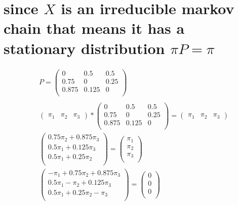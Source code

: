 \documentclass[11px]{article}
\begin{document}
\section*{since $X$ is an irreducible markov chain that means it has a stationary distribution $\pi P = \pi$}

\begin{equation}
\begin{split}
& P = \begin{pmatrix}
0 & 0.5 & 0.5 \\
0.75 & 0 & 0.25 \\
0.875 & 0.125 & 0 \\
\end{pmatrix} 
\\
\\
& \begin{pmatrix}
\pi_1 & \pi_2 & \pi_3
\end{pmatrix}
*
\begin{pmatrix}
0 & 0.5 & 0.5 \\
0.75 & 0 & 0.25 \\
0.875 & 0.125 & 0 \\
\end{pmatrix}
= \begin{pmatrix}
\pi_1 & \pi_2 & \pi_3
\end{pmatrix} \\
& \begin{pmatrix}
0.75 \pi_2 + 0.875 \pi_3 \\
0.5 \pi_1 + 0.125 \pi_3 \\
0.5 \pi_1 + 0.25 \pi_2 \\
\end{pmatrix}
=
\begin{pmatrix}
\pi_1 \\
\pi_2 \\
\pi_3 \\
\end{pmatrix} \\
& \begin{pmatrix}
-\pi_1 + 0.75 \pi_2 + 0.875 \pi_3 \\
0.5 \pi_1 - \pi_2 + 0.125 \pi_3 \\
0.5 \pi_1 + 0.25 \pi_2 - \pi_3\\
\end{pmatrix}
=
\begin{pmatrix}
0 \\
0 \\
0 \\
\end{pmatrix} \\

\end{split}
\end{equation}
\end{document}
